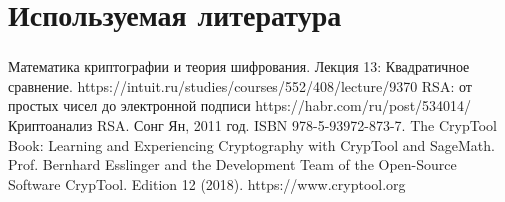 \documentclass[t]{beamer}
\begin{document}
\section{Используемая литература}

\begin{frame}
    \frametitle{\insertsection}
    \begin{thebibliography}{1}
    Математика криптографии и теория шифрования. Лекция 13: Квадратичное сравнение.\newline
    https://intuit.ru/studies/courses/552/408/lecture/9370
    RSA: от простых чисел до электронной подписи \newline 
    https://habr.com/ru/post/534014/
    Криптоанализ RSA. Сонг Ян, 2011 год. ISBN 978-5-93972-873-7.
    The CrypTool Book: Learning and Experiencing Cryptography with CrypTool and SageMath. Prof. Bernhard Esslinger and the Development Team of the Open-Source Software CrypTool. Edition 12 (2018).\newline
    https://www.cryptool.org
    \end{thebibliography}
\end{frame}
\end{document}
